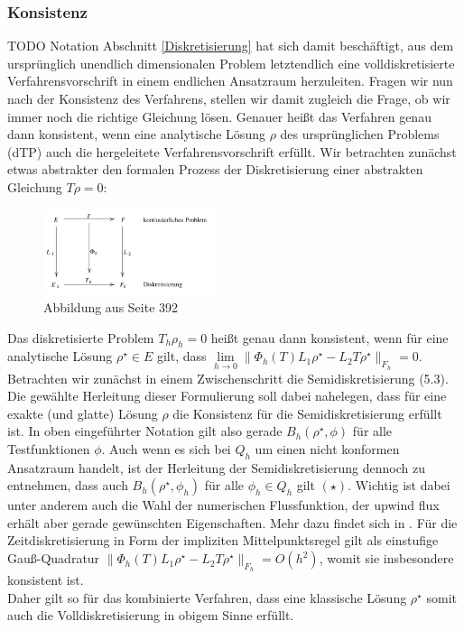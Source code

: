 \subsubsection{Konsistenz}
TODO Notation
	 Abschnitt \ref{Diskretisierung} hat sich damit beschäftigt, aus dem ursprünglich unendlich dimensionalen Problem letztendlich eine volldiskretisierte Verfahrensvorschrift in einem endlichen Ansatzraum herzuleiten. Fragen wir nun nach der Konsistenz des Verfahrens, stellen wir damit zugleich die Frage, ob wir immer noch die richtige Gleichung lösen. Genauer heißt das Verfahren genau dann konsistent, wenn eine analytische Lösung $ \rho $ des ursprünglichen Problems (dTP) auch die hergeleitete Verfahrensvorschrift erfüllt. 
	 Wir betrachten zunächst etwas abstrakter den formalen Prozess der Diskretisierung einer abstrakten Gleichung $ T \rho=0 $:
	 \begin{figure}[H]
	 	\centering
	 	\includegraphics[width=0.45\textwidth]{abstraktkonsistenz.png} \\
	 	Abbildung aus \cite{brokate2016grundwissen} Seite 392
	 \end{figure}
	 Das diskretisierte Problem $ T_h \rho_h = 0  $ heißt genau dann konsistent, wenn für eine analytische Lösung $ \rho^{\star} \in E $ gilt, dass $ \lim\limits_{h \to 0}\lVert \Phi_h(T)L_1\rho^{\star} - L_2T\rho^{\star} \rVert_{F_h} = 0 $.
	 Betrachten wir zunächst in einem Zwischenschritt die Semidiskretisierung (5.3).
	 Die gewählte Herleitung dieser Formulierung soll dabei nahelegen, dass für eine exakte (und glatte) Lösung $ \rho $ die Konsistenz für die Semidiskretisierung erfüllt ist. In oben eingeführter Notation gilt also gerade $ B_h(\rho^{\star},\phi) $ für alle Testfunktionen $ \phi $. Auch wenn es sich bei $ Q_h $ um einen nicht konformen Ansatzraum handelt, ist der Herleitung der Semidiskretisierung dennoch zu entnehmen, dass auch $ B_h(\rho^{\star},\phi_h) $ für alle $ \phi_h \in Q_h $ gilt $(\star)$.  Wichtig ist dabei unter anderem auch die Wahl der numerischen Flussfunktion, der upwind flux erhält aber gerade gewünschten Eigenschaften. 
	 Mehr dazu findet sich in \cite{Har08b}.
	 Für die Zeitdiskretisierung in Form der impliziten Mittelpunktsregel gilt als einstufige Gauß-Quadratur $ \lVert \Phi_h(T)L_1\rho^{\star} - L_2T\rho^{\star} \rVert_{F_h} = O(h^2)$, womit sie insbesondere konsistent ist. \\
	 Daher gilt so für das kombinierte Verfahren, dass eine klassische Lösung $ \rho^{\star} $ somit auch die Volldiskretisierung in obigem Sinne erfüllt. 
